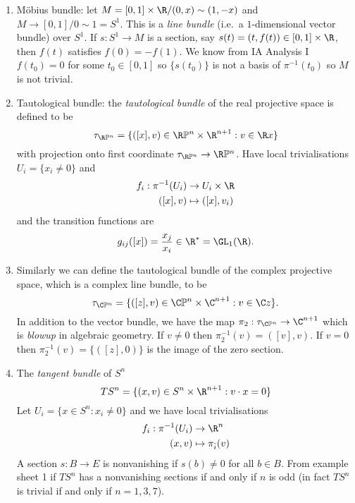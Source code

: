 \documentclass[a4paper]{article}
\renewcommand*{\P}{\mathbb{P}}
\begin{document}
\begin{eg}\leavevmode
  \begin{enumerate}
  \item Möbius bundle: let \(M = [0, 1] \times \R /(0, x) \sim (1, -x)\) and \(M \to [0, 1]/0 \sim 1 = S^1\). This is a \emph{line bundle} (i.e.\ a \(1\)-dimensional vector bundle) over \(S^1\). If \(s: S^1 \to M\) is a section, say \(s(t) = (t, f(t)) \in [0, 1] \times \R\), then \(f(t)\) satisfies \(f(0) = -f(1)\). We know from IA Analysis I \(f(t_0) = 0\) for some \(t_0 \in [0, 1]\) so \(\{s(t_0)\}\) is not a basis of \(\pi^{-1}(t_0)\) so \(M\) is not trivial.
  \item Tautological bundle: the \emph{tautological bundle} of the real projective space is defined to be
    \[
      \tau_{\R\P^n} = \{([x], v) \in \R\P^n \times \R^{n + 1}: v \in \R x\}
    \]
    with projection onto first coordinate \(\tau_{\R\P^n} \to \R\P^n\). Have local trivialisations \(U_i = \{x_i \neq 0\}\) and
    \begin{align*}
      f_i: \pi^{-1}(U_i) &\to U_i \times \R \\
      ([x], v) &\mapsto ([x], v_i)
    \end{align*}
    and the transition functions are
    \[
      g_{ij}([x]) = \frac{x_j}{x_i} \in \R^* = \GL_1(\R).
    \]
  \item Similarly we can define the tautological bundle of the complex projective space, which is a complex line bundle, to be
    \[
      \tau_{\C\P^n} = \{([z], v) \in \C\P^n \times \C^{n + 1}: v \in \C z\}.
    \]
    In addition to the vector bundle, we have the map \(\pi_2: \tau_{\C\P^n} \to \C^{n + 1}\) which is \emph{blowup} in algebraic geometry. If \(v \neq 0\) then \(\pi_2^{-1}(v) = ([v], v)\). If \(v = 0\) then \(\pi_2^{-1}(v) = \{([z], 0)\}\) is the image of the zero section.
  \item The \emph{tangent bundle} of \(S^n\)
    \[
      TS^n = \{(x, v) \in S^n \times \R^{n + 1}: v \cdot x = 0\}
    \]
    Let \(U_i = \{x \in S^n: x_i \neq 0\}\) and we have local trivialisations
    \begin{align*}
      f_i: \pi^{-1}(U_i) &\to \R^n \\
      (x, v) &\mapsto \pi_{\hat i}(v)
    \end{align*}
    A section \(s: B \to E\) is nonvanishing if \(s(b) \neq 0\) for all \(b \in B\). From example sheet 1 if \(TS^n\) has a nonvanishing sections if and only if \(n\) is odd (in fact \(TS^n\) is trivial if and only if \(n = 1, 3, 7\)).

\end{enumerate}
\end{eg}
\end{document}
